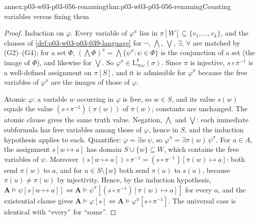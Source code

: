 \begin{annexitem}{annex:p03-w03-p03-056-renaming}{thm:p03-w03-p03-056-renaming}{Counting variables versus fixing them}
\begin{proof}
Induction on \(\varphi\). Every variable of \(\varphi^\pi\) lies in
\(\pi[W]\subseteq\{v_1,\ldots,v_k\}\), and the clauses of
\cref{def:p03-w03-p03-039-language} for \(\neg\), \(\bigwedge\),
\(\bigvee\), \(\exists\), \(\forall\) are matched by (G2)--(G4); for a set
\(\Phi\), \((\bigwedge\Phi)^\pi=\bigwedge\{\psi^\pi:\psi\in\Phi\}\) is the
conjunction of a set (the image of \(\Phi\)), and likewise for
\(\bigvee\). So \(\varphi^\pi\in\mathrm{L}^k_{\infty\omega}(\sigma)\). Since
\(\pi\) is injective, \(s\circ\pi^{-1}\) is a well-defined assignment on
\(\pi[S]\), and it is admissible for \(\varphi^\pi\) because the free
variables of \(\varphi^\pi\) are the images of those of \(\varphi\).

Atomic \(\varphi\): a variable \(w\) occurring in \(\varphi\) is free, so
\(w\in S\), and its value \(s(w)\) equals the value
\((s\circ\pi^{-1})(\pi(w))\) of \(\pi(w)\); constants are unchanged. The
atomic clause gives the same truth value. Negation, \(\bigwedge\) and
\(\bigvee\): each immediate subformula has free variables among those of
\(\varphi\), hence in \(S\), and the induction hypothesis applies to each.
Quantifier: \(\varphi=\exists w\,\psi\), so
\(\varphi^\pi=\exists\pi(w)\,\psi^\pi\). For \(a\in A\), the assignment
\(s[w\mapsto a]\) has domain \(S\cup\{w\}\subseteq W\), which contains the
free variables of \(\psi\). Moreover
\((s[w\mapsto a])\circ\pi^{-1}=(s\circ\pi^{-1})[\pi(w)\mapsto a]\): both
send \(\pi(w)\) to \(a\), and for \(u\in S\setminus\{w\}\) both send
\(\pi(u)\) to \(s(u)\), because \(\pi(u)\neq\pi(w)\) by injectivity. Hence,
by the induction hypothesis,
\(\mathbf A\models\psi[s[w\mapsto a]]\iff
\mathbf A\models\psi^\pi[(s\circ\pi^{-1})[\pi(w)\mapsto a]]\) for every
\(a\), and the existential clause gives
\(\mathbf A\models\varphi[s]\iff\mathbf A\models\varphi^\pi[s\circ\pi^{-1}]\).
The universal case is identical with ``every'' for ``some''.
\end{proof}
\end{annexitem}

